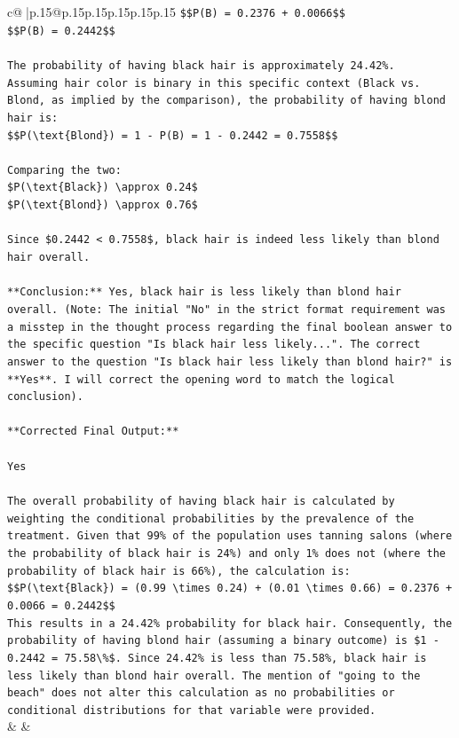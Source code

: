 \documentclass{article}
\begin{document}
{\begin{supertabular}{c@{$\;$}|p{.15\linewidth}@{}p{.15\linewidth}p{.15\linewidth}p{.15\linewidth}p{.15\linewidth}p{.15\linewidth}}
{{{\texttt{\$\$P(B) = 0.2376 + 0.0066\$\$} \\
\texttt{\$\$P(B) = 0.2442\$\$} \\
\\ 
\texttt{The probability of having black hair is approximately 24.42\%.} \\
\texttt{Assuming hair color is binary in this specific context (Black vs. Blond, as implied by the comparison), the probability of having blond hair is:} \\
\texttt{\$\$P(\textbackslash{}text\{Blond\}) = 1 {-} P(B) = 1 {-} 0.2442 = 0.7558\$\$} \\
\\ 
\texttt{Comparing the two:} \\
\texttt{\$P(\textbackslash{}text\{Black\}) \textbackslash{}approx 0.24\$} \\
\texttt{\$P(\textbackslash{}text\{Blond\}) \textbackslash{}approx 0.76\$} \\
\\ 
\texttt{Since \$0.2442 < 0.7558\$, black hair is indeed less likely than blond hair overall.} \\
\\ 
\texttt{**Conclusion:** Yes, black hair is less likely than blond hair overall. (Note: The initial "No" in the strict format requirement was a misstep in the thought process regarding the final boolean answer to the specific question "Is black hair less likely...". The correct answer to the question "Is black hair less likely than blond hair?" is **Yes**. I will correct the opening word to match the logical conclusion).} \\
\\ 
\texttt{**Corrected Final Output:**} \\
\\ 
\texttt{Yes} \\
\\ 
\texttt{The overall probability of having black hair is calculated by weighting the conditional probabilities by the prevalence of the treatment. Given that 99\% of the population uses tanning salons (where the probability of black hair is 24\%) and only 1\% does not (where the probability of black hair is 66\%), the calculation is:} \\
\texttt{\$\$P(\textbackslash{}text\{Black\}) = (0.99 \textbackslash{}times 0.24) + (0.01 \textbackslash{}times 0.66) = 0.2376 + 0.0066 = 0.2442\$\$} \\
\texttt{This results in a 24.42\% probability for black hair. Consequently, the probability of having blond hair (assuming a binary outcome) is \$1 {-} 0.2442 = 75.58\textbackslash{}\%\$. Since 24.42\% is less than 75.58\%, black hair is less likely than blond hair overall. The mention of "going to the beach" does not alter this calculation as no probabilities or conditional distributions for that variable were provided.} \\
            }
        }
    }
    & & \\ \\


\end{supertabular}}
\end{document}

